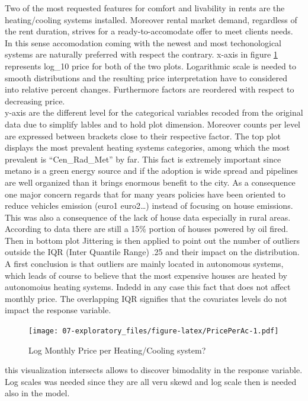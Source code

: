 \documentclass[
  12pt,
  a4paper,
  oneside]{book}
\theoremstyle{definition}
\theoremstyle{definition}
\theoremstyle{definition}
\theoremstyle{remark}
\begin{document}
Two of the most requested features for comfort and livability in rents are the heating/cooling systems installed. Moreover rental market demand, regardless of the rent duration, strives for a ready-to-accomodate offer to meet clients needs. In this sense accomodation coming with the newest and most techonological systems are naturally preferred with respect the contrary.
x-axis in figure \ref{fig:PricePerAc} represents log\_10 price for both of the two plots. Logarithmic scale is needed to smooth distributions and the resulting price interpretation have to considered into relative percent changes. Furthermore factors are reordered with respect to decreasing price.\\
y-axis are the different level for the categorical variables recoded from the original data due to simplify lables and to hold plot dimension. Moreover counts per level are expressed between brackets close to their respective factor.
The top plot displays the most prevalent heating systems categories, among which the most prevalent is ``Cen\_Rad\_Met'' by far. This fact is extremely important since metano is a green energy source and if the adoption is wide spread and pipelines are well organized than it brings enormous benefit to the city. As a consequence one major concern regards that for many years policies have been oriented to reduce vehicles emission (euro1 euro2\ldots) instead of focusing on house emissions. This was also a consequence of the lack of house data especially in rural areas. According to data there are still a 15\% portion of houses powered by oil fired.
Then in bottom plot Jittering is then applied to point out the number of outliers outside the IQR (Inter Quantile Range) .25 and their impact on the distribution. A first conclusion is that outliers are mainly located in autonomous systems, which leads of course to believe that the most expensive houses are heated by autonomoius heating systems. Indedd in any case this fact that does not affect monthly price. The overlapping IQR signifies that the covariates levels do not impact the response variable.

\begin{figure}
\centering
\texttt{[image: 07-exploratory\_files/figure-latex/PricePerAc-1.pdf]}
\caption{\label{fig:PricePerAc}Log Monthly Price per Heating/Cooling system?}
\end{figure}

this visualization intersects allows to discover bimodality in the response variable. Log scales was needed since they are all veru skewd and log scale then is needed also in the model.
\end{document}
